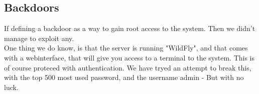 \subsection{Backdoors}

If defining a backdoor as a way to gain root access to the system. Then we didn't manage to exploit any. \\
One thing we do know, is that the server is running "WildFly", and that comes with a webinterface, that will give you access to a terminal to the system. This is of course proteced with  authentication. We have tryed an attempt to break this, with the top 500 most used password, and the username admin - But with no luck.  